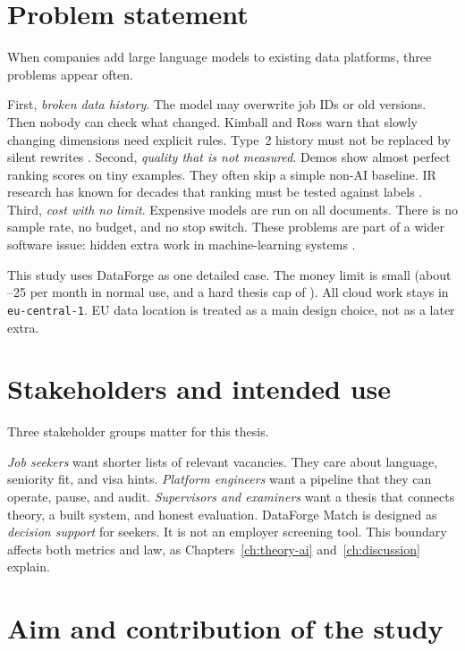 \section{Problem statement}
\label{sec:problem}

When companies add large language models to existing data platforms, three problems appear often.

First, \emph{broken data history}. The model may overwrite job IDs or old versions. Then nobody can check what changed. Kimball and Ross warn that slowly changing dimensions need explicit rules. Type~2 history must not be replaced by silent rewrites . Second, \emph{quality that is not measured}. Demos show almost perfect ranking scores on tiny examples. They often skip a simple non-AI baseline. IR research has known for decades that ranking must be tested against labels . Third, \emph{cost with no limit}. Expensive models are run on all documents. There is no sample rate, no budget, and no stop switch. These problems are part of a wider software issue: hidden extra work in machine-learning systems .

This study uses DataForge as one detailed case. The money limit is small (about --25 per month in normal use, and a hard thesis cap of ). All cloud work stays in \texttt{eu-central-1}. EU data location is treated as a main design choice, not as a later extra.

\section{Stakeholders and intended use}
\label{sec:stakeholders}

Three stakeholder groups matter for this thesis.

\emph{Job seekers} want shorter lists of relevant vacancies. They care about language, seniority fit, and visa hints. \emph{Platform engineers} want a pipeline that they can operate, pause, and audit. \emph{Supervisors and examiners} want a thesis that connects theory, a built system, and honest evaluation. DataForge Match is designed as \emph{decision support} for seekers. It is not an employer screening tool. This boundary affects both metrics and law, as Chapters~\ref{ch:theory-ai} and~\ref{ch:discussion} explain.

\section{Aim and contribution of the study}
\label{sec:aim}

